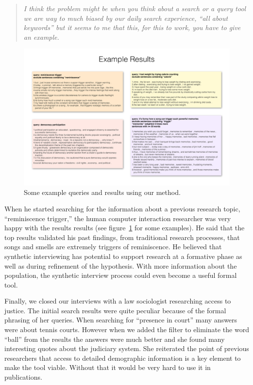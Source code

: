 \documentclass{sigchi}
\begin{document}
\begin{quote}
{\em
I think the problem might be when you think about a search or a query tool we are way to much biased by our daily search experience, ``all about keywords'' but it seems to me that this, for this to work, you have to give an example.
}\end{quote}

\begin{figure}[ht!]
\centering \includegraphics[width=\textwidth]{figures/results_2} 
\caption{Some example queries and results using our method.  \label{fig:reminiscenceTriggers}}
\end{figure}

When he started searching for the information about a previous research topic, ``reminiscence trigger,'' the human computer interaction researcher was very happy with the results results (see figure~\ref{fig:reminiscenceTriggers} for some examples). He said that the top results validated his past findings, from traditional research processes, that songs and smells are extremely triggers of reminiscence. He believed that synthetic interviewing has potential to support research at a formative phase as well as during refinement of the hypothesis. With more information about the population, the synthetic interview process could even become a useful formal tool.

Finally, we closed our interviews with a law sociologist researching access to justice. The initial search results were quite peculiar because of the formal phrasing of her queries. When searching for ``presence in court'' many answers were about tennis courts. However when we added the filter to eliminate the word ``ball'' from the results the answers were much better and she found many interesting quotes about the judiciary system. She reiterated the point of previous researchers that access to detailed demographic information is a key element to make the tool viable. Without that it would be very hard to use it in publications.
\end{document}
